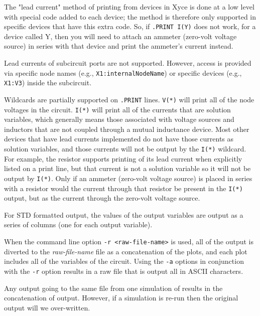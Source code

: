 \begin{Command}
\begin{XyceItemize}
\item The "lead current" method of printing from devices in Xyce is done
  at a low level with special code added to each device; the method is
  therefore only supported in specific devices that have this extra
  code.  So, if \texttt{.PRINT I(Y)} does not work, for a device called
  Y, then you will need to attach an ammeter (zero-volt voltage source)
  in series with that device and print the ammeter's current instead.

\item Lead currents of subcircuit ports are not supported.  However,
  access is provided via specific node names (e.g.,
  \texttt{X1:internalNodeName}) or specific devices (e.g.,
  \texttt{X1:V3}) inside the subcircuit.

\item Wildcards are partially supported on \texttt{.PRINT}
  lines. \texttt{V(*)} will print all of the node voltages in the
  circuit.  \texttt{I(*)} will print all of the currents that are
  solution variables, which generally means those associated with
  voltage sources and inductors that are not coupled through a mutual
  inductance device.  Most other devices that have lead currents
  implemented do not have those currents as solution variables, and
  those currents will not be output by the \texttt{I(*)} wildcard.
  For example, the resistor supports printing of its lead current when
  explicitly listed on a print line, but that current is not a
  solution variable so it will not be output by \texttt{I(*)}.  Only
  if an ammeter (zero-volt voltage source) is placed in series with a
  resistor would the current through that resistor be present in
  the \texttt{I(*)} output, but as the current through the zero-volt
  voltage source.

\item For STD formatted output, the values of the output variables are
  output as a series of columns (one for each output variable).

\item When the command line option \texttt{-r <raw-file-name>} is used,
  all of the output is diverted to the \emph{raw-file-name} file as a
  concatenation of the plots, and each plot includes all of the
  variables of the circuit.  Using the \texttt{-a} options in
  conjunction with the \texttt{-r} option results in a raw file that is
  output all in ASCII characters.

\item Any output going to the same file from one simulation of \Xyce{}
  results in the concatenation of output.  However, if a simulation is
  re-run then the original output will we over-written.


\end{XyceItemize}
\end{Command}
